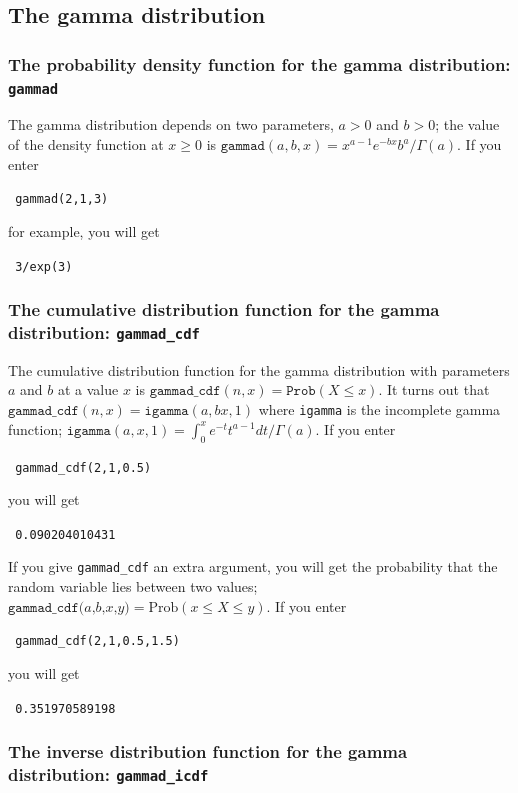 \documentclass[a4paper,11pt]{book}
\begin{document}
\subsection{The gamma distribution}
\subsubsection{The probability density function for the gamma distribution: \texttt{gammad}}

The gamma distribution depends on two parameters, $a>0$ and $b>0$; the
value of the density function at $x \ge 0$ is
$\texttt{gammad}(a,b,x) = x^{a-1}e^{-bx}b^a/\Gamma(a)$.   If you enter
\begin{center}
  \tt
  gammad(2,1,3)
\end{center}
for example, you will get
\begin{center}
  \tt
  3/exp(3)  
\end{center}

\subsubsection{The cumulative distribution function for the gamma distribution: \texttt{gammad\_cdf}}

The cumulative distribution function for the gamma distribution with
parameters $a$ and $b$ at a value $x$ is
$\texttt{gammad\_cdf}(n,x) = \texttt{Prob}(X \le x)$.  It turns out that
$\texttt{gammad\_cdf}(n,x) = \texttt{igamma}(a, bx, 1)$ where
\texttt{igamma} is the incomplete gamma function; 
$\texttt{igamma}(a,x,1) = \int_0^x e^{-t}t^{a-1}dt/\Gamma(a)$.
If you
enter
\begin{center}
  \tt
  gammad\_cdf(2,1,0.5)
\end{center}
you will get
\begin{center}
  \tt
  0.090204010431
\end{center}

If you give \texttt{gammad\_cdf} an extra argument,
you will get the probability that
the random variable lies between two values;
$\texttt{gammad\_cdf($a$,$b$,$x$,$y$)} = \text{Prob}(x \le X \le y)$.  If you
enter
\begin{center}
  \tt
  gammad\_cdf(2,1,0.5,1.5)
\end{center}
you will get
\begin{center}
  \tt
  0.351970589198
\end{center}

\subsubsection{The inverse distribution function for the gamma distribution: \texttt{gammad\_icdf}}
\end{document}
